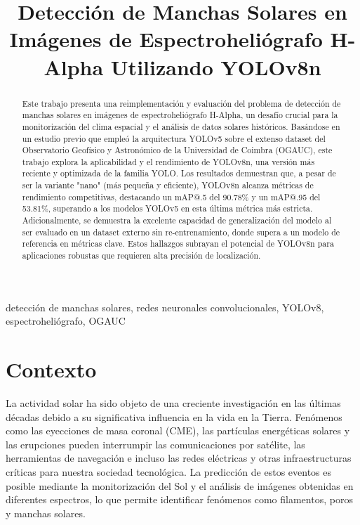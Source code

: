 \documentclass[journal]{IEEEtran}
\begin{document}
\title{Detección de Manchas Solares en Imágenes de Espectroheliógrafo H-Alpha Utilizando YOLOv8n}


\author{
}

\maketitle

\begin{abstract}
Este trabajo presenta una reimplementación y evaluación del problema de detección de manchas solares en imágenes de espectroheliógrafo H-Alpha, un desafío crucial para la monitorización del clima espacial y el análisis de datos solares históricos. Basándose en un estudio previo que empleó la arquitectura YOLOv5 sobre el extenso dataset del Observatorio Geofísico y Astronómico de la Universidad de Coimbra (OGAUC), este trabajo explora la aplicabilidad y el rendimiento de YOLOv8n, una versión más reciente y optimizada de la familia YOLO. Los resultados demuestran que, a pesar de ser la variante "nano" (más pequeña y eficiente), YOLOv8n alcanza métricas de rendimiento competitivas, destacando un mAP@.5 del 90.78\% y un mAP@.95 del 53.81\%, superando a los modelos YOLOv5 en esta última métrica más estricta. Adicionalmente, se demuestra la excelente capacidad de generalización del modelo al ser evaluado en un dataset externo sin re-entrenamiento, donde supera a un modelo de referencia en métricas clave. Estos hallazgos subrayan el potencial de YOLOv8n para aplicaciones robustas que requieren alta precisión de localización.

\end{abstract}

\begin{IEEEkeywords}
detección de manchas solares, redes neuronales convolucionales, YOLOv8, espectroheliógrafo, OGAUC
\end{IEEEkeywords}


\section{Contexto}
La actividad solar ha sido objeto de una creciente investigación en las últimas décadas debido a su significativa influencia en la vida en la Tierra. Fenómenos como las eyecciones de masa coronal (CME), las partículas energéticas solares y las erupciones pueden interrumpir las comunicaciones por satélite, las herramientas de navegación e incluso las redes eléctricas y otras infraestructuras críticas para nuestra sociedad tecnológica. La predicción de estos eventos es posible mediante la monitorización del Sol y el análisis de imágenes obtenidas en diferentes espectros, lo que permite identificar fenómenos como filamentos, poros y manchas solares.
\end{document}
